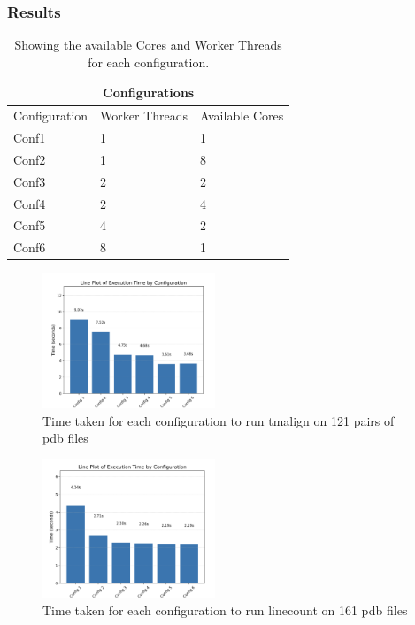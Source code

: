 \documentclass[]{final_report}
\begin{document}
\subsubsection{Results}
\begin{table}[h]
    \begin{center}
        \begin{tabular}{ |p{3.5cm}|p{3.5cm}|p{3.5cm}|  }
            \hline
            \multicolumn{3}{|c|}{Configurations} \\
            \hline
            Configuration&Worker Threads&Available Cores\\
            \hline
            Conf1&1&1\\
            \hline
            Conf2&1&8\\
            \hline
            Conf3&2&2\\
            \hline
            Conf4&2&4\\
            \hline
            Conf5&4&2\\
            \hline
            Conf6&8&1\\
            \hline
        \end{tabular}
        \caption{\label{Configurations}Showing the available Cores and Worker Threads for each configuration.} 
    \end{center}
\end{table}

\begin{figure}[ht]
    \centering
    \includegraphics[width=0.46\textwidth]{TmalignBench.png}
    \caption{\label{fig:TmalignBench}Time taken for each configuration to run tmalign on 121 pairs of pdb files}
\end{figure}

\vspace{30px}

\begin{figure}[ht]
    \centering
    \includegraphics[width=0.46\textwidth]{linesBench.png}
    \caption{\label{fig:linesBench}Time taken for each configuration to run linecount on 161 pdb files}
\end{figure}
\end{document}
